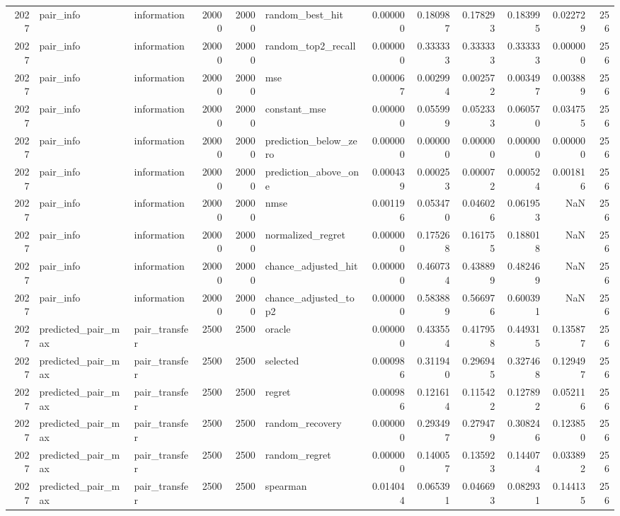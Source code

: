\begin{tabular}{rllrrlrrrrrr}
2027 & pair_info & information & 20000 & 20000 & random_best_hit & 0.000000 & 0.180987 & 0.178293 & 0.183995 & 0.022729 & 256 \\
2027 & pair_info & information & 20000 & 20000 & random_top2_recall & 0.000000 & 0.333333 & 0.333333 & 0.333333 & 0.000000 & 256 \\
2027 & pair_info & information & 20000 & 20000 & mse & 0.000067 & 0.002994 & 0.002572 & 0.003497 & 0.003889 & 256 \\
2027 & pair_info & information & 20000 & 20000 & constant_mse & 0.000000 & 0.055999 & 0.052333 & 0.060570 & 0.034755 & 256 \\
2027 & pair_info & information & 20000 & 20000 & prediction_below_zero & 0.000000 & 0.000000 & 0.000000 & 0.000000 & 0.000000 & 256 \\
2027 & pair_info & information & 20000 & 20000 & prediction_above_one & 0.000439 & 0.000253 & 0.000072 & 0.000524 & 0.001816 & 256 \\
2027 & pair_info & information & 20000 & 20000 & nmse & 0.001196 & 0.053470 & 0.046026 & 0.061953 & NaN & 256 \\
2027 & pair_info & information & 20000 & 20000 & normalized_regret & 0.000000 & 0.175268 & 0.161755 & 0.188018 & NaN & 256 \\
2027 & pair_info & information & 20000 & 20000 & chance_adjusted_hit & 0.000000 & 0.460734 & 0.438899 & 0.482469 & NaN & 256 \\
2027 & pair_info & information & 20000 & 20000 & chance_adjusted_top2 & 0.000000 & 0.583889 & 0.566976 & 0.600391 & NaN & 256 \\
2027 & predicted_pair_max & pair_transfer & 2500 & 2500 & oracle & 0.000000 & 0.433554 & 0.417958 & 0.449315 & 0.135877 & 256 \\
2027 & predicted_pair_max & pair_transfer & 2500 & 2500 & selected & 0.000986 & 0.311940 & 0.296945 & 0.327468 & 0.129497 & 256 \\
2027 & predicted_pair_max & pair_transfer & 2500 & 2500 & regret & 0.000986 & 0.121614 & 0.115422 & 0.127892 & 0.052116 & 256 \\
2027 & predicted_pair_max & pair_transfer & 2500 & 2500 & random_recovery & 0.000000 & 0.293497 & 0.279479 & 0.308246 & 0.123850 & 256 \\
2027 & predicted_pair_max & pair_transfer & 2500 & 2500 & random_regret & 0.000000 & 0.140057 & 0.135923 & 0.144074 & 0.033892 & 256 \\
2027 & predicted_pair_max & pair_transfer & 2500 & 2500 & spearman & 0.014044 & 0.065391 & 0.046693 & 0.082931 & 0.144135 & 256 \\

\end{tabular}
